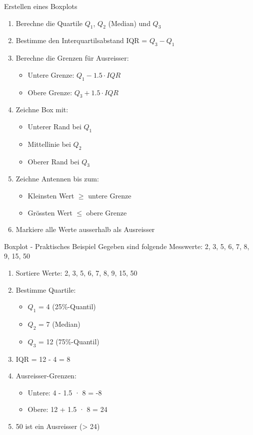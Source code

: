 \begin{KR}{Erstellen eines Boxplots}
\begin{enumerate}
    \item Berechne die Quartile $Q_1$, $Q_2$ (Median) und $Q_3$
    \item Bestimme den Interquartilsabstand IQR = $Q_3 - Q_1$
    \item Berechne die Grenzen für Ausreisser:
        \begin{itemize}
            \item Untere Grenze: $Q_1 - 1.5 \cdot IQR$
            \item Obere Grenze: $Q_3 + 1.5 \cdot IQR$
        \end{itemize}
    \item Zeichne Box mit:
        \begin{itemize}
            \item Unterer Rand bei $Q_1$
            \item Mittellinie bei $Q_2$
            \item Oberer Rand bei $Q_3$
        \end{itemize}
    \item Zeichne Antennen bis zum:
        \begin{itemize}
            \item Kleinsten Wert  $\geqslant$  untere Grenze
            \item Grössten Wert $\leqslant$  obere Grenze
        \end{itemize}
    \item Markiere alle Werte ausserhalb als Ausreisser
\end{enumerate}
\end{KR}

\begin{example2}{Boxplot - Praktisches Beispiel}
Gegeben sind folgende Messwerte: 2, 3, 5, 6, 7, 8, 9, 15, 50\\
\begin{enumerate}
    \item Sortiere Werte: 2, 3, 5, 6, 7, 8, 9, 15, 50
    \item Bestimme Quartile:
        \begin{itemize}
            \item $Q_1$ = 4 (25\%-Quantil)
            \item $Q_2$ = 7 (Median)
            \item $Q_3$ = 12 (75\%-Quantil)
        \end{itemize}
    \item IQR = 12 - 4 = 8
    \item Ausreisser-Grenzen:
        \begin{itemize}
            \item Untere: 4 - 1.5 · 8 = -8
            \item Obere: 12 + 1.5 · 8 = 24
        \end{itemize}
    \item 50 ist ein Ausreisser (> 24)
\end{enumerate}
\end{example2}

